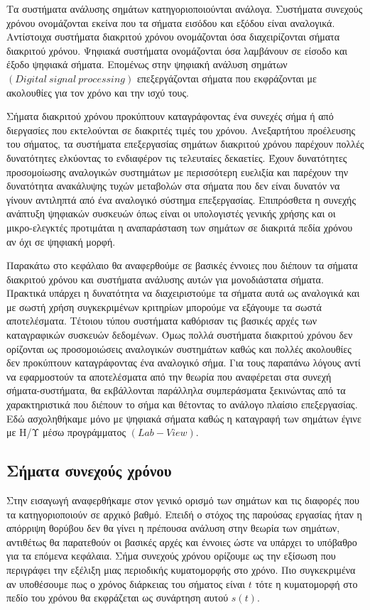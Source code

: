 \documentclass[breaklines=true, 12pt]{article}
\begin{document}
Τα συστήματα ανάλυσης σημάτων κατηγοριοποιούνται ανάλογα. Συστήματα συνεχούς
χρόνου ονομάζονται εκείνα που τα σήματα εισόδου και εξόδου είναι αναλογικά.
Αντίστοιχα συστήματα διακριτού χρόνου ονομάζονται όσα διαχειρίζονται σήματα
διακριτού χρόνου. Ψηφιακά συστήματα ονομάζονται όσα λαμβάνουν σε είσοδο και
έξοδο ψηφιακά σήματα. Επομένως στην ψηφιακή ανάλυση σημάτων
\({(Digital\ signal\ processing)}\) επεξεργάζονται σήματα που εκφράζονται
με ακολουθίες για τον χρόνο και την ισχύ τους.

Σήματα διακριτού χρόνου προκύπτουν καταγράφοντας ένα συνεχές σήμα ή από
διεργασίες που εκτελούνται σε διακριτές τιμές του χρόνου. Ανεξαρτήτου
προέλευσης του σήματος, τα συστήματα επεξεργασίας σημάτων διακριτού χρόνου
παρέχουν πολλές δυνατότητες ελκύοντας το ενδιαφέρον τις τελευταίες
δεκαετίες. Έχουν δυνατότητες προσομοίωσης αναλογικών συστημάτων με
περισσότερη ευελιξία και παρέχουν την δυνατότητα ανακάλυψης τυχών μεταβολών
στα σήματα που δεν είναι δυνατόν να γίνουν αντιληπτά από ένα αναλογικό
σύστημα επεξεργασίας. Επιπρόσθετα η συνεχής ανάπτυξη ψηφιακών συσκευών
όπως είναι οι υπολογιστές γενικής χρήσης και οι μικρο-ελεγκτές προτιμάται
η αναπαράσταση των σημάτων σε διακριτά πεδία χρόνου αν όχι σε ψηφιακή μορφή.

Παρακάτω στο κεφάλαιο θα αναφερθούμε σε βασικές έννοιες που διέπουν τα σήματα
διακριτού χρόνου και συστήματα ανάλυσης αυτών για μονοδιάστατα σήματα.
Πρακτικά υπάρχει η δυνατότητα να διαχειριστούμε τα σήματα αυτά ως αναλογικά
και με σωστή χρήση συγκεκριμένων κριτηρίων μπορούμε να εξάγουμε τα σωστά
αποτελέσματα. Τέτοιου τύπου συστήματα καθόρισαν τις βασικές αρχές των
καταγραφικών συσκευών δεδομένων. Όμως πολλά συστήματα διακριτού χρόνου
δεν ορίζονται ως προσομοιώσεις αναλογικών συστημάτων καθώς και πολλές
ακολουθίες δεν προκύπτουν καταγράφοντας ένα αναλογικό σήμα. Για τους
παραπάνω λόγους αντί να εφαρμοστούν τα αποτελέσματα από την θεωρία που
αναφέρεται στα συνεχή σήματα-συστήματα, θα εκβάλλονται παράλληλα συμπεράσματα
ξεκινώντας από τα χαρακτηριστικά που διέπουν το σήμα και θέτοντας το
ανάλογο πλαίσιο επεξεργασίας. Εδώ ασχοληθήκαμε μόνο με ψηφιακά σήματα
καθώς η καταγραφή των σημάτων έγινε με Η/Υ μέσω προγράμματος \({(Lab-View)}\).

\subsection{Σήματα συνεχούς χρόνου}
\label{sec:orgc638d79}
Στην εισαγωγή αναφερθήκαμε στον γενικό ορισμό των σημάτων και τις διαφορές
που τα κατηγοριοποιούν σε αρχικό βαθμό. Επειδή ο στόχος της παρούσας εργασίας
ήταν η απόρριψη θορύβου δεν θα γίνει η πρέπουσα ανάλυση στην θεωρία των σημάτων,
αντιθέτως θα παρατεθούν οι βασικές αρχές και έννοιες ώστε να υπάρχει το υπόβαθρο
για τα επόμενα κεφάλαια. Σήμα συνεχούς χρόνου ορίζουμε ως την εξίσωση που
περιγράφει την εξέλιξη μιας περιοδικής κυματομορφής στο χρόνο. Πιο συγκεκριμένα
αν υποθέσουμε πως ο χρόνος διάρκειας του σήματος είναι \(t\) τότε η κυματομορφή στο
πεδίο του χρόνου θα εκφράζεται ως συνάρτηση αυτού \(s(t)\).
\end{document}
